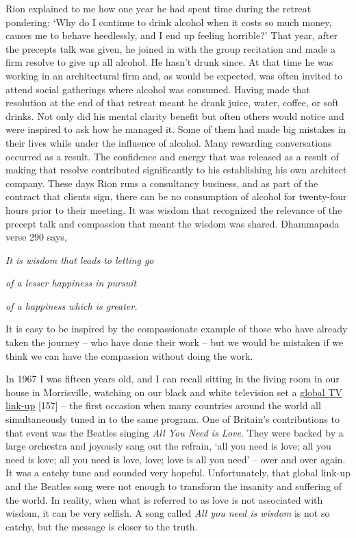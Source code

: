 Rion explained to me how one year he had spent time during the retreat
pondering: `Why do I continue to drink alcohol when it costs so much
money, causes me to behave heedlessly, and I end up feeling horrible?'
That year, after the precepts talk was given, he joined in with the
group recitation and made a firm resolve to give up all alcohol. He
hasn't drunk since. At that time he was working in an architectural firm
and, as would be expected, was often invited to attend social gatherings
where alcohol was consumed. Having made that resolution at the end of
that retreat meant he drank juice, water, coffee, or soft drinks. Not
only did his mental clarity benefit but often others would notice and
were inspired to ask how he managed it. Some of them had made big
mistakes in their lives while under the influence of alcohol. Many
rewarding conversations occurred as a result. The confidence and energy
that was released as a result of making that resolve contributed
significantly to his establishing his own architect company. These days
Rion runs a consultancy business, and as part of the contract that
clients sign, there can be no consumption of alcohol for twenty-four
hours prior to their meeting. It was wisdom that recognized the
relevance of the precept talk and compassion that meant the wisdom was
shared. Dhammapada verse 290 says,

\emph{It is wisdom that leads to letting go}

\emph{of a lesser happiness in pursuit}

\emph{of a happiness which is greater.}

It is easy to be inspired by the compassionate example of those who have
already taken the journey -- who have done their work -- but we would be
mistaken if we think we can have the compassion without doing the work.

In 1967 I was fifteen years old, and I can recall sitting in the living
room in our house in Morrisville, watching on our black and white
television set a
\href{https://www.bbc.co.uk/blogs/genome/entries/581d6e34-67f3-40e2-a372-12a4947d4c56\#:~:text=Transmitted\%20live\%20around\%20the\%20world,experience\%20and\%20establish\%20closer\%20links.}{\underline{global
TV link-up}} {[}157{]} -- the first occasion when many countries around
the world all simultaneously tuned in to the same program. One of
Britain's contributions to that event was the Beatles singing \emph{All
You Need is Love}. They were backed by a large orchestra and joyously
sang out the refrain, `all you need is love; all you need is love; all
you need is love, love; love is all you need' -- over and over again. It
was a catchy tune and sounded very hopeful. Unfortunately, that global
link-up and the Beatles song were not enough to transform the insanity
and suffering of the world. In reality, when what is referred to as love
is not associated with wisdom, it can be very selfish. A song called
\emph{All you need is wisdom} is not so catchy, but the message is
closer to the truth.

